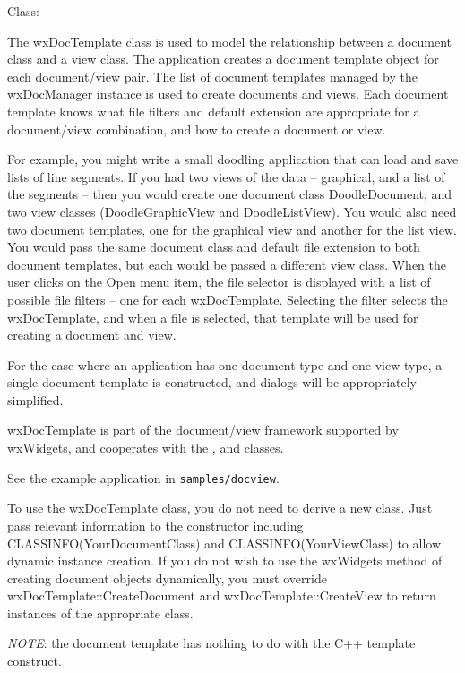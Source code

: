 
Class: 

The wxDocTemplate class is used to model the relationship between a
document class and a view class. The application creates a document
template object for each document/view pair. The list of document
templates managed by the wxDocManager instance is used to create
documents and views. Each document template knows what file filters
and default extension are appropriate for a document/view combination,
and how to create a document or view.

For example, you might write a small doodling application that can load
and save lists of line segments. If you had two views of the data -- graphical,
and a list of the segments -- then you would create one document class DoodleDocument,
and two view classes (DoodleGraphicView and DoodleListView). You would also
need two document templates, one for the graphical view and another for the
list view. You would pass the same document class and default file extension to both
document templates, but each would be passed a different view class. When
the user clicks on the Open menu item, the file selector is displayed
with a list of possible file filters -- one for each wxDocTemplate. Selecting
the filter selects the wxDocTemplate, and when
a file is selected, that template will be used for creating a document
and view.

For the case where an application has one document type and one view type,
a single document template is constructed, and dialogs will be appropriately
simplified.

wxDocTemplate is part of the document/view framework supported by wxWidgets,
and cooperates with the ,  
and  classes.

See the example application in {\tt samples/docview}.

To use the wxDocTemplate class, you do not need to derive a new class.
Just pass relevant information to the constructor including CLASSINFO(YourDocumentClass) and
CLASSINFO(YourViewClass) to allow dynamic instance creation.
If you do not wish to use the wxWidgets method of creating document
objects dynamically, you must override wxDocTemplate::CreateDocument
and wxDocTemplate::CreateView to return instances of the appropriate class.

{\it NOTE}: the document template has nothing to do with the C++ template construct.

